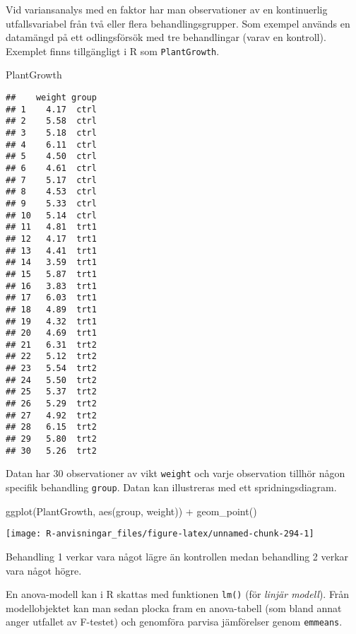 \documentclass[
]{book}
\newenvironment{Shaded}{\begin{snugshade}}{\end{snugshade}}
\newcommand{\FunctionTok}[1]{\textcolor[rgb]{0.00,0.00,0.00}{#1}}
\newcommand{\NormalTok}[1]{#1}
\newcommand{\SpecialCharTok}[1]{\textcolor[rgb]{0.00,0.00,0.00}{#1}}
\theoremstyle{definition}
\theoremstyle{definition}
\theoremstyle{definition}
\theoremstyle{definition}
\theoremstyle{remark}
\begin{document}
Vid variansanalys med en faktor har man observationer av en kontinuerlig utfallsvariabel från två eller flera behandlingsgrupper. Som exempel används en datamängd på ett odlingsförsök med tre behandlingar (varav en kontroll). Exemplet finns tillgängligt i R som \texttt{PlantGrowth}.

\begin{Shaded}
\begin{Highlighting}[]
\NormalTok{PlantGrowth}
\end{Highlighting}
\end{Shaded}

\begin{verbatim}
##    weight group
## 1    4.17  ctrl
## 2    5.58  ctrl
## 3    5.18  ctrl
## 4    6.11  ctrl
## 5    4.50  ctrl
## 6    4.61  ctrl
## 7    5.17  ctrl
## 8    4.53  ctrl
## 9    5.33  ctrl
## 10   5.14  ctrl
## 11   4.81  trt1
## 12   4.17  trt1
## 13   4.41  trt1
## 14   3.59  trt1
## 15   5.87  trt1
## 16   3.83  trt1
## 17   6.03  trt1
## 18   4.89  trt1
## 19   4.32  trt1
## 20   4.69  trt1
## 21   6.31  trt2
## 22   5.12  trt2
## 23   5.54  trt2
## 24   5.50  trt2
## 25   5.37  trt2
## 26   5.29  trt2
## 27   4.92  trt2
## 28   6.15  trt2
## 29   5.80  trt2
## 30   5.26  trt2
\end{verbatim}

Datan har 30 observationer av vikt \texttt{weight} och varje observation tillhör någon specifik behandling \texttt{group}. Datan kan illustreras med ett spridningsdiagram.

\begin{Shaded}
\begin{Highlighting}[]
\FunctionTok{ggplot}\NormalTok{(PlantGrowth, }\FunctionTok{aes}\NormalTok{(group, weight)) }\SpecialCharTok{+}
  \FunctionTok{geom\_point}\NormalTok{()}
\end{Highlighting}
\end{Shaded}

\begin{center}\texttt{[image: R-anvisningar\_files/figure-latex/unnamed-chunk-294-1]} \end{center}

Behandling 1 verkar vara något lägre än kontrollen medan behandling 2 verkar vara något högre.

En anova-modell kan i R skattas med funktionen \texttt{lm()} (för \emph{linjär modell}). Från modellobjektet kan man sedan plocka fram en anova-tabell (som bland annat anger utfallet av F-testet) och genomföra parvisa jämförelser genom \texttt{emmeans}.
\end{document}

